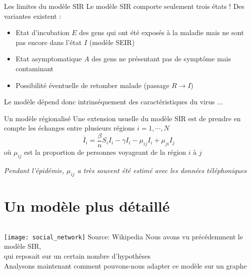\documentclass[10pt]{beamer}
\begin{document}
\begin{frame}{Les limites du modèle SIR}
  Le modèle SIR comporte seulement trois états ! Des variantes existent :
  \begin{itemize}
    \item Etat d'incubation $E$ des gens qui ont été exposés à la maladie mais ne sont pas
      encore dans l'état $I$ (modèle SEIR)
    \item Etat asymptomatique $A$ des gens ne présentant pas de symptôme
      mais contaminant
    \item Possibilité éventuelle de retomber malade (passage $R \to I$)
  \end{itemize}

  Le modèle dépend donc intrinséquement des caractéristiques du virus ...
\end{frame}

\begin{frame}{Un modèle régionalisé}
  Une extension usuelle du modèle SIR est de prendre en compte les échanges
  entre plusieurs régions $i = 1, \cdots, N$
  \[
    \dot{I_i} = \frac{\beta}{n} S_i I_i - \gamma I_i - \mu_{ij} I_i +
    \mu_{ji} I_j
  \]
  où $\mu_{ij}$ est la proportion de personnes voyageant de la région $i$ à $j$

  \vspace{1cm}

  \pause
  \emph{
  Pendant l'épidémie, $\mu_{ij}$ a très souvent été estimé avec les données
  téléphoniques
  }
\end{frame}

\section{Un modèle plus détaillé}

\begin{frame}{}
  \begin{columns}
    \texttt{[image: social\_network]}
    {\tiny
      Source: Wikipedia
    }
    Nous avons vu précédemment le modèle SIR,\\
    qui reposait sur un certain nombre d'hypothèses\\[1cm]

    Analysons maintenant comment pouvons-nous adapter ce modèle sur un graphe
  \end{columns}
\end{frame}
\end{document}
